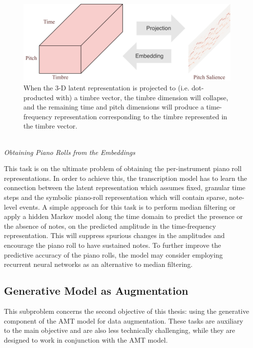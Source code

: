 \begin{figure}
	\includegraphics[width=\textwidth]{projection.pdf}
	\caption{When the 3-D latent representation is projected to (i.e. dot-producted with) a timbre vector, the timbre dimension will collapse, and the remaining time and pitch dimensions will produce a time-frequency representation corresponding to the timbre represented in the timbre vector.}
	\label{fig:latent-projection}
\end{figure}


\mbox{}\\\noindent\emph{Obtaining Piano Rolls from the Embeddings}\mbox{}

This task is on the ultimate problem of obtaining the per-instrument piano roll representations.
In order to achieve this, the transcription model has to learn the connection between the latent representation which assumes fixed, granular time steps and the symbolic piano-roll representation which will contain sparse, note-level events.
A simple approach for this task is to perform median filtering or apply a hidden Markov model along the time domain to predict the presence or the absence of notes, on the predicted amplitude in the time-frequency representation.
This will suppress spurious changes in the amplitudes and encourage the piano roll to have sustained notes.
To further improve the predictive accuracy of the piano rolls, the model may consider employing recurrent neural networks as an alternative to median filtering.


\subsection{Generative Model as Augmentation}

This subproblem concerns the second objective of this thesis: using the generative component of the AMT model for data augmentation.
These tasks are auxiliary to the main objective and are also less technically challenging, while they are designed to work in conjunction with the AMT model.

